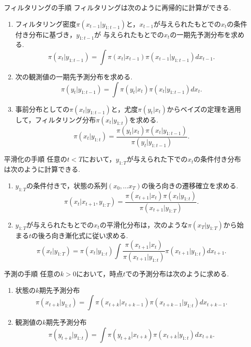 \documentclass[dvipdfmx]{beamer}
\begin{document}
\begin{frame}{フィルタリングの手順}
フィルタリングは次のように再帰的に計算ができる.
\begin{enumerate}
 \item フィルタリング密度$\pi(x_{t-1}|y_{1:t-1})$と，$x_{t-1}$が与えられたもとでの$x_t$の条件付き分布に基づき，$y_{1:t-1}$が
与えられたもとでの$x_t$の一期先予測分布を求める.
\begin{equation}
\label{eq:filter1}
\pi(x_t|y_{1:t-1})=\int \pi(x_t|x_{t-1})\pi(x_{t-1}|y_{1:t-1})dx_{t-1}.
\end{equation} 
 \item 次の観測値の一期先予測分布を求める.
\begin{equation*}
\label{eq:filter2}
\pi(y_t|y_{1:t-1})=\int \pi(y_t|x_t)\pi(x_t|y_{1:t-1})dx_t.
\end{equation*}
 \item 事前分布としての$\pi(x_t|y_{1:t-1})$と，尤度$\pi(y_t|x_t)$からベイズの定理を適用して，フィルタリング分布$\pi(x_t|y_{1:t})$を求める.
\begin{equation*}
\pi(x_t|y_{1:t})=\frac{\pi(y_t|x_t)\pi(x_t|y_{1:t-1})}{\pi(y_t|y_{1:t-1})}.
\end{equation*}
\end{enumerate}
\end{frame}

\begin{frame}{平滑化の手順}
任意の$t<T$において，$y_{1:T}$が与えられた下での$x_t$の条件付き分布は次のように計算できる.
\begin{enumerate}
 \item $y_{1:T}$の条件付きで，状態の系列$(x_0,\dots x_T)$の後ろ向きの遷移確立を求める.
\begin{equation*}
 \pi(x_t|x_{t+1},y_{1:T})=\frac{\pi(x_{t+1}|x_t)\pi(x_t|y_{1:t})}{\pi(x_{t+1}|y_{1:T})}.
\end{equation*}
 \item $y_{1:T}$が与えられたもとでの$x_t$の平滑化分布は，次のような$\pi(x_T|y_{1:T})$から始まる$t$の後ろ向き漸化式に従い求める.
\begin{equation*}
\pi(x_t|y_{1:T})=\pi(x_t|y_{1:t})\int \frac{\pi(x_{t+1}|x_t)}{\pi(x_{t+1}|y_{1:t})}\pi(x_{t+1}|y_{1:t})dx_{t+1}.
\end{equation*}
\end{enumerate}
\end{frame}


\begin{frame}{予測の手順}
任意の$k>0$において，時点$t$での予測分布は次のように求める.
\begin{enumerate}
 \item 状態の$k$期先予測分布
\begin{equation*}
\pi(x_{t+k}|y_{1:t})=\int\pi(x_{t+k}|x_{t+k-1})\pi(x_{t+k-1}|y_{1:t})dx_{t+k-1}.
\end{equation*}
 \item 観測値の$k$期先予測分布
\begin{equation*}
\pi(y_{t+k}|y_{1:t})=\int \pi(y_{t+k}|x_{t+k})\pi(x_{t+k}|y_{1:t})dx_{t+k}.
\end{equation*}
\end{enumerate}
\end{frame}
\end{document}
